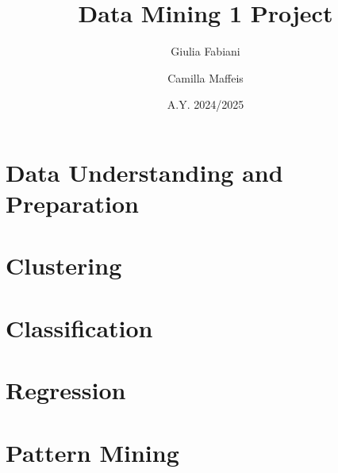 \documentclass[a4paper, 10pt, twocolumn, DIV=calc]{scrartcl}
\begin{document}
\author{Giulia Fabiani \and Camilla Maffeis}
\title{Data Mining 1 Project}
\date{A.Y. 2024/2025}


\begin{titlepage}
    \maketitle
    \vfill
    \tableofcontents
    \vfill
\end{titlepage}

\section{Data Understanding and Preparation}

\section{Clustering}

\section{Classification}

\section{Regression}

\section{Pattern Mining}

\end{document}
